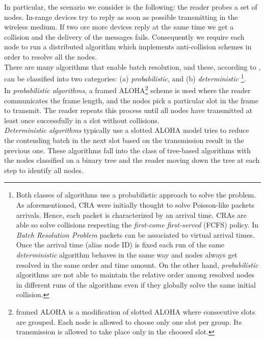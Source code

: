 \documentclass[12pt,a4paper]{report}
\begin{document}
In particular, the scenario we consider is the following: the reader probes a set of nodes. 
In-range devices try to reply as soon as possible transmitting in the wireless medium. If two ore more devices reply at the same time we get a collision and the delivery of the messages fails. Consequently we require each node to run a distributed algorithm which implements anti-collision schemes in order to resolve all the nodes.\\
There are many algorithms that enable batch resolution, and these, according to \cite{lucent}, can be classified into two categories: (a) \emph{probabilistic}, and (b) \emph{deterministic} \footnote{Both classes of algorithms use a probabilistic approach to solve the problem. As aforementioned, CRA were initially thought to solve Poisson-like packets arrivals. Hence, each packet is characterized by an arrival time. CRAs are able so solve collisions respecting the \emph{first-come first-served} (FCFS) policy. In \emph{Batch Resolution Problem} packets can be associated to virtual arrival times. Once the arrival time (alias node ID) is fixed each run of the same \emph{deterministic} algorithm behaves in the same way and nodes always get resolved in the same order and time amount. On the other hand, \emph{probabilistic} algorithms are not able to maintain the relative order among resolved nodes in different runs of the algorithms even if they globally solve the same initial collision.}.\\

In \emph{probabilistic algorithms}, a framed ALOHA\footnote{ framed ALOHA is a modification of slotted ALOHA where consecutive slots are grouped. Each node is allowed to choose only one slot per group. Its transmission is allowed to take place only in the choosed slot.} scheme is used where the reader communicates the frame length, and the nodes pick a particular slot in the frame to transmit. The reader repeats this process until all nodes have transmitted at least once successfully in a slot without collisions.\\ 


\emph{Deterministic algorithms} typically use a slotted ALOHA model tries to reduce the contending batch in the next slot based on the transmission result in the previous one. These algorithms fall into the class of tree-based algorithms with the nodes classified on a binary tree and the reader moving down the tree at each step to identify all nodes. \\
\end{document}

